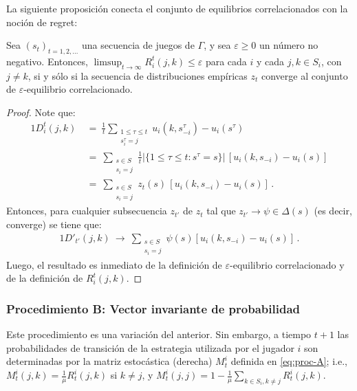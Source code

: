 La siguiente proposición conecta el conjunto de equilibrios correlacionados con la noción de regret: 

\begin{proposition}
\label{prop:no-regret}
Sea $(s_t)_{t = 1, 2, ...}$ una secuencia de juegos de $\Gamma$, y sea $\varepsilon \geq 0$ un número no negativo.
Entonces, $\limsup_{t \rightarrow \infty} R_i^t(j, k) \leq \varepsilon$ para cada $i$ y cada $j, k \in S_i$, con $j \neq k$, si y sólo si la secuencia de distribuciones empíricas $z_t$ converge al conjunto de $\varepsilon$-equilibrio correlacionado.
\end{proposition}

\begin{proof}
Note que:
\begin{alignat}{1}
  D_i^t(j, k)\ 
    &=\ \frac{1}{t} \sum_{\substack{1\leq \tau \leq t \\ s_i^{\tau}=j}} u_i(k, s_{-i}^{\tau}) - u_i(s^{\tau}) \\
    &=\ \sum_{ \substack{s \in S \\ s_i = j}} \frac{1}{t} |\{1\leq\tau \leq t : s^{\tau} = s\}|\,[u_i(k, s_{-i}) - u_i(s)] \\
    &=\ \sum_{ \substack{s \in S \\ s_i = j}} z_t(s)\,[u_i(k, s_{-i}) - u_i(s)] \,.
\end{alignat}
Entonces, para cualquier subsecuencia $z_{t'}$ de $z_t$ tal que $z_{t'} \rightarrow \psi \in \Delta(s)$ (es decir, converge) se tiene que:
\begin{alignat}{1}
	D'_{t'}(j, k)\ \longrightarrow\ \sum_{\substack{s\in S \\ s_i = j}}\psi(s)[u_i(k, s_{-i}) - u_i(s)] \,.
\end{alignat}
Luego, el resultado es inmediato de la definición de $\varepsilon$-equilibrio correlacionado y de la definición de $R_i^t(j, k)$.
\end{proof}

\subsubsection{Procedimiento B: Vector invariante de probabilidad}

Este procedimiento es una variación del anterior. Sin embargo, a tiempo $t+1$ las probabilidades de transición de la estrategia utilizada por el jugador $i$ son determinadas por la matriz estocástica (derecha) $M^i_t$ definida en \eqref{eq:proc-A}; i.e., $M^i_t(j,k)=\frac{1}{\mu}R^i_t(j,k)$ si $k\neq j$, y $M^i_t(j,j)=1-\frac{1}{\mu}\sum_{k\in S_i,k\neq j} R^i_t(j,k)$.

